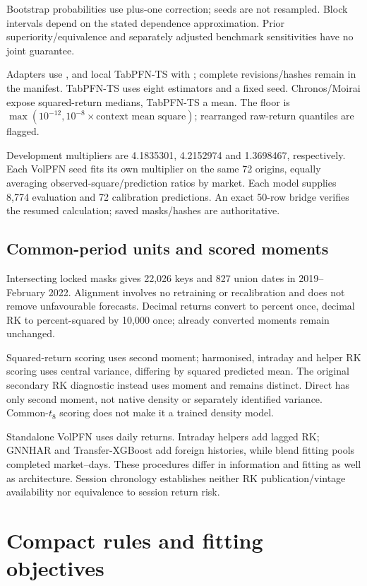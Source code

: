 Bootstrap probabilities use plus-one correction; seeds are not resampled. Block intervals depend on the stated dependence approximation. Prior superiority/equivalence and separately adjusted benchmark sensitivities have no joint guarantee.

Adapters use ,  and local TabPFN-TS with ; complete revisions/hashes remain in the manifest. TabPFN-TS uses eight estimators and a fixed seed. Chronos/Moirai expose squared-return medians, TabPFN-TS a mean. The floor is $\max(10^{-12},10^{-8}\times\text{context mean square})$; rearranged raw-return quantiles are flagged.

Development multipliers are 4.1835301, 4.2152974 and 1.3698467, respectively. Each VolPFN seed fits its own multiplier on the same 72 origins, equally averaging observed-square/prediction ratios by market. Each model supplies 8,774 evaluation and 72 calibration predictions. An exact 50-row bridge verifies the resumed calculation; saved masks/hashes are authoritative.

\subsection{Common-period units and scored moments}
\label{sec:common-period-units}

Intersecting locked masks gives 22,026 keys and 827 union dates in 2019--February 2022. Alignment involves no retraining or recalibration and does not remove unfavourable forecasts. Decimal returns convert to percent once, decimal RK to percent-squared by 10,000 once; already converted moments remain unchanged.

Squared-return scoring uses second moment; harmonised, intraday and helper RK scoring uses central variance, differing by squared predicted mean. The original secondary RK diagnostic instead uses moment and remains distinct. Direct has only second moment, not native density or separately identified variance. Common-$t_8$ scoring does not make it a trained density model.

Standalone VolPFN uses daily returns. Intraday helpers add lagged RK; GNNHAR and Transfer-XGBoost add foreign histories, while blend fitting pools completed market--days. These procedures differ in information and fitting as well as architecture. Session chronology establishes neither RK publication/vintage availability nor equivalence to session return risk.


\section{Compact rules and fitting objectives}

